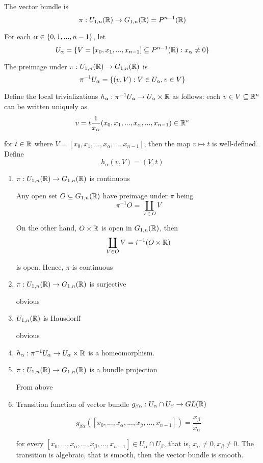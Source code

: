 \begin{remark}[case $r=1$, $K=\R$]
	The vector bundle is 
	$$
	\pi: U_{1,n}(\mathbb{R}) \to G_{1,n}(\mathbb{R}) = P^{n-1}(\mathbb{R})
	$$
	
	For each $\alpha \in \{0, 1, ..., n-1\}$, let
	$$
	U_\alpha = \{V = [x_0, x_1, ..., x_{n-1}] \subseteq P^{n-1}(\mathbb{R}): x_\alpha \neq 0\}
	$$
	
	The preimage under $\pi: U_{1,n}(\mathbb{R}) \to G_{1,n}(\mathbb{R})$ is
	$$
	\pi^{-1} U_\alpha = \{(v, V): V \in U_\alpha, v \in V\}
	$$
	
	Define the local trivializations $h_\alpha: \pi^{-1} U_\alpha \to U_\alpha \times \mathbb{R}$ as follows: each $v \in V \subseteq \mathbb{R}^n$ can be written uniquely as 
	$$
	v = t \frac{1}{x_\alpha} (x_0, x_1, ..., x_\alpha, ..., x_{n-1}) \in \mathbb{R}^n
	$$
	
	for $t \in \mathbb{R}$ where $V = [x_0, x_1, ..., x_\alpha, ..., x_{n-1}]$, then the map $v \mapsto t$ is well-defined. Define
	$$
	h_\alpha(v, V) = (V, t)
	$$
	
	\begin{enumerate}
		\item $\pi: U_{1,n}(\mathbb{R}) \to G_{1,n}(\mathbb{R})$ is continuous
		
		Any open set $O \subseteq G_{1,n}(\mathbb{R})$ have preimage under $\pi$ being
		$$
		\pi^{-1} O = \coprod_{V \in O} V
		$$
		
		On the other hand, $O \times \mathbb{R}$ is open in $G_{1,n}(\mathbb{R})$, then 
		$$
		\coprod_{V \in O} V = i^{-1}(O \times \mathbb{R})
		$$
		
		is open. Hence, $\pi$ is continuous
		
		\item $\pi: U_{1,n}(\mathbb{R}) \to G_{1,n}(\mathbb{R})$ is surjective
		
		obvious
		
		\item $U_{1,n}(\mathbb{R})$ is Hausdorff
		
		obvious
		
		\item $h_\alpha: \pi^{-1} U_\alpha \to U_\alpha \times \mathbb{R}$ is a homeomorphism.
		
		
		\item $\pi: U_{1,n}(\mathbb{R}) \to G_{1,n}(\mathbb{R})$ is a bundle projection
		
		From above
		
		\item Transition function of vector bundle $g_{\beta \alpha}: U_\alpha \cap U_\beta \to GL(\mathbb{R})$
		
		$$
		g_{\beta \alpha}([x_0, ..., x_\alpha, ..., x_\beta, ..., x_{n-1}]) = \frac{x_\beta}{x_\alpha}
		$$
		
		for every $[x_0, ..., x_\alpha, ..., x_\beta, ..., x_{n-1}] \in U_\alpha \cap U_\beta$, that is, $x_\alpha \neq 0, x_\beta \neq 0$. The transition is algebraic, that is smooth, then the vector bundle is smooth. 
		
	\end{enumerate}
	
	
\end{remark}

